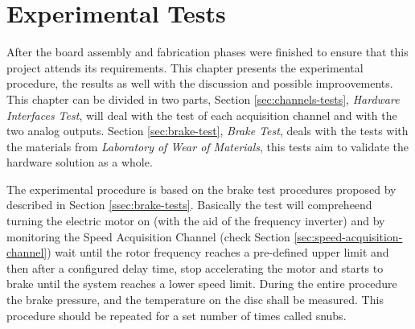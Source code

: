 \chapter{Experimental Tests}\label{ch:experimentalTests}
		After the board assembly and fabrication phases were finished to ensure that this project attends its requirements. This chapter presents the experimental procedure, the results as well with the discussion and possible improovements. This chapter can be divided in two parts, Section \ref{sec:channels-tests}, \textit{Hardware Interfaces Test}, will deal with the test of each acquisition channel and with the two analog outputs. Section \ref{sec:brake-test}, \textit{Brake Test}, deals with the tests with the materials from \textit{Laboratory of Wear of Materials}, this tests aim to validate the hardware solution as a whole.
		\par
		The experimental procedure is based on the brake test procedures proposed by \cite{saej2522} described in Section \ref{ssec:brake-tests}. Basically the test will compreheend turning the electric motor on (with the aid of the frequency inverter) and by monitoring the Speed Acquisition Channel (check Section \ref{sec:speed-acquisition-channel}) wait until the rotor frequency reaches a pre-defined upper limit and then after a configured delay time, stop accelerating the motor and starts to brake until the system reaches a lower speed limit. During the entire procedure the brake pressure, and the temperature on the disc shall be measured. This procedure should be repeated for a set number of times called snubs. 

		
		